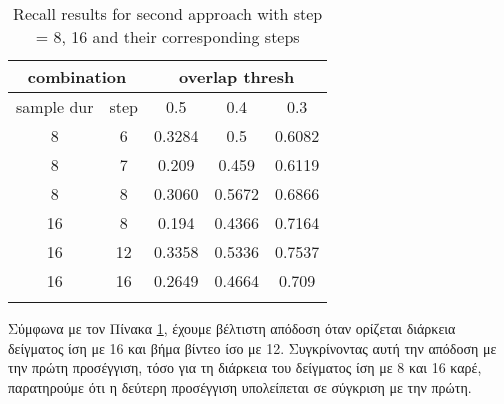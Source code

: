\begin{center}
\en
\begin{longtable}{||c c||c c c||}
  \hline
  \multicolumn{2}{||c||}{\textbf{combination}} &\multicolumn{3}{|c||}{\textbf{overlap thresh}}\\

  \hline
  sample dur & step &   0.5  &  0.4 &  0.3 \\
  \hline   \hline
  8 & 6 & 0.3284 & 0.5 & 0.6082  \\
  \hline
  8 & 7 & 0.209	& 0.459 & 0.6119 \\
  \hline
  8 & 8 & 0.3060 & 0.5672 & 0.6866 \\
  \hline
  16 & 8  & 0.194 & 0.4366 & 0.7164 \\
  \hline
  16 & 12 & 0.3358 & 0.5336 & 0.7537 \\
  \hline
  16 & 16 & 0.2649 & 0.4664 & 0.709 \\
  
  \hline     \hline                          

  \caption{Recall results for second approach with step = 8, 16 and their corresponding steps }
  \label{table:gr_conn_app2}
\end{longtable} 
\end{center}

Σύμφωνα με τον Πίνακα \ref{table:gr_conn_app2}, έχουμε βέλτιστη απόδοση όταν ορίζεται διάρκεια δείγματος ίση με 16 και  βήμα βίντεο ίσο με 12.
Συγκρίνοντας αυτή την απόδοση με την πρώτη προσέγγιση, τόσο για τη διάρκεια του δείγματος ίση  με 8 και 16 καρέ, παρατηρούμε  ότι η δεύτερη
προσέγγιση υπολείπεται σε σύγκριση με την πρώτη.

